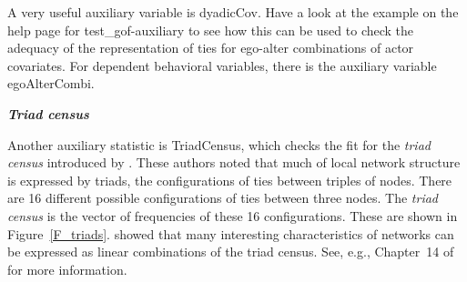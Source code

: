 \documentclass[a4paper,fleqn,11pt]{article}
\newcommand{\+}{\, + \,}
\newcommand{\sfn}[1]{\textsf{#1}}
\begin{document}
A very useful auxiliary variable is \sfn{dyadicCov}. Have a look at the example
on the help page for  \sfn{test\_gof-auxiliary} to see how this can be used
to check the adequacy of the representation of ties for ego-alter combinations
of actor covariates. For dependent behavioral variables, there is the
auxiliary variable \sfn{egoAlterCombi}.
\medskip

\noindent
\textbf{\emph{Triad census}}
\smallskip

\noindent
Another auxiliary statistic is \sfn{TriadCensus},
which checks the fit for the \emph{triad census}
introduced by \citet{HollandLeinhardt1970,HollandLeinhardt1976}.
These authors noted that
much of local network structure is expressed by triads,
the configurations of ties between triples of nodes.
There are 16 different possible configurations of ties between three nodes.
The \emph{triad census} is the vector of frequencies of these 16 configurations.
These are shown in Figure~\ref{F_triads}.
\citet{HollandLeinhardt1976} showed that many interesting characteristics
of networks can be expressed as linear combinations of the
triad census.
See, e.g., Chapter~14 of \citet{WassermanFaust94} for more information.
\end{document}
